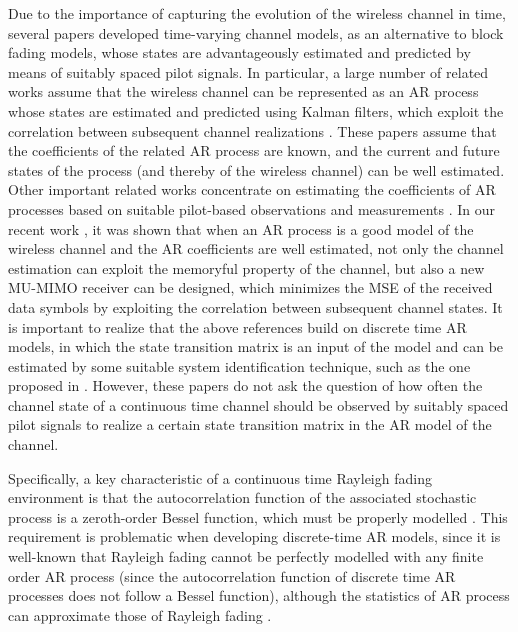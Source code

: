 \documentclass[conference, a4paper, 10pt]{IEEEtran}
\begin{document}
Due to the importance of capturing the evolution of the wireless channel in time, several papers developed
time-varying channel models, as an alternative to block fading models, whose states are advantageously estimated
and predicted by means of suitably spaced pilot signals. In particular,
a large number of related works assume that the wireless channel can be represented as an \ac{AR} process whose
states are estimated and predicted using Kalman filters, which exploit the correlation between subsequent
channel realizations \cite{Abeida:10, Hijazi:10, Truong:13, Kim:20, Fodor:21}.
These papers assume that the coefficients of the related \ac{AR} process are known, and the
current and future states of the process (and thereby of the wireless channel) can be well estimated.
Other important related works concentrate on estimating the coefficients of \ac{AR} processes based on
suitable pilot-based observations and measurements \cite{Mahmoudi:11, Xia:15, Esfandiari:20}.
In our recent work \cite{Fodor:21}, it was shown that when an \ac{AR} process is a good model of the
wireless channel and the \ac{AR} coefficients are well estimated, not only the channel estimation can
exploit the memoryful property of the channel, but also a new \ac{MU-MIMO} receiver can be
designed, which minimizes the \ac{MSE} of the received data symbols by exploiting the correlation
between subsequent channel states.
It is important to realize that the above references build on discrete time \ac{AR} models, in which the state transition matrix is an input of the model and can be estimated by some suitable system identification technique, such as the one
proposed in \cite{Esfandiari:20}.
However, these papers do not ask the question of how often
the channel state of a continuous time channel should be observed by suitably spaced pilot signals to realize a certain state transition matrix in the \ac{AR} model of the channel.

Specifically, a key characteristic of a continuous time Rayleigh fading environment is that the autocorrelation
function of the associated stochastic process is a zeroth-order Bessel function, which must be properly modelled \cite{Zheng:03, Wang:07}.
This requirement is problematic when developing discrete-time \ac{AR} models, %
since it is well-known
that Rayleigh fading cannot be perfectly modelled with any finite order \ac{AR} process
(since the autocorrelation function of discrete time \ac{AR} processes does not follow a Bessel function),
although the statistics of \ac{AR} process can approximate those of Rayleigh fading \cite{McGuire:05,Zheng:05}.
\end{document}
